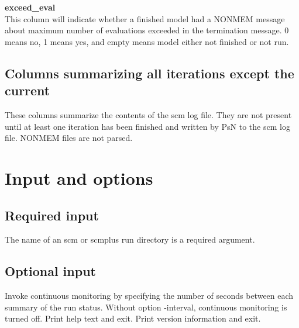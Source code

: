 \documentclass[hideglossary,notoc,hidelof,hidelot,hideTheSignaturePage,hideLinkCurrent,hideloa,pdfLatex,noClient,notitle,hideConfidential]{PMXstyle-20170118kajsa4}
\begin{document}
{\bfseries exceed\_eval}\\
This column will indicate whether a finished model had a NONMEM message about maximum number
of evaluations exceeded in the termination message. 0 means no, 1 means yes, and empty means
model either not finished or not run.

\subsection{Columns summarizing all iterations except the current}
These columns summarize the contents of the scm log file. 
They are not present until at least one iteration has been finished and written by PsN
to the scm log file.
NONMEM files are not parsed.



\section{Input and options}

\subsection{Required input}
The name of an scm or scmplus run directory is a required argument.

\subsection{Optional input}

\begin{optionlist}
Invoke continuous monitoring by specifying the number of seconds
between each summary of the run status.
Without option -interval, continuous monitoring is turned off.
\nextopt
{}
Print help text and exit.
\nextopt
{}
Print version information and exit.
\nextopt
\end{optionlist}
\end{document}
